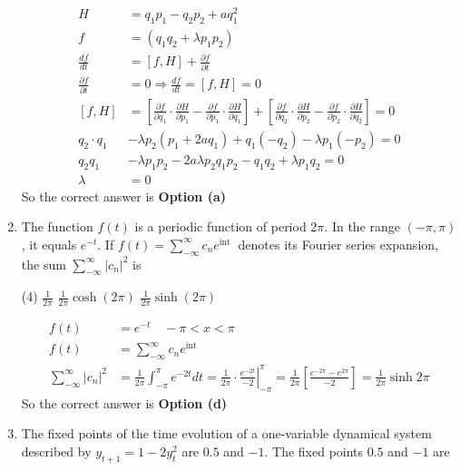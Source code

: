 \begin{enumerate}
\begin{answer}
\begin{align*}
	H&=q_{1} p_{1}-q_{2} p_{2}+a q_{1}^{2}\\
	f&=\left(q_{1} q_{2}+\lambda p_{1} p_{2}\right) \\
	\frac{d f}{d t}&=[f, H]+\frac{\partial f}{\partial t} \\
	\frac{\partial f}{\partial t}&=0 \Rightarrow \frac{d f}{d t}=[f, H]=0\\
	[f, H]&=\left[\frac{\partial f}{\partial q_{1}} \cdot \frac{\partial H}{\partial p_{1}}-\frac{\partial f}{\partial p_{1}} \cdot \frac{\partial H}{\partial q_{1}}\right]+\left[\frac{\partial f}{\partial q_{2}} \cdot \frac{\partial H}{\partial p_{2}}-\frac{\partial f}{\partial p_{2}} \cdot \frac{\partial H}{\partial q_{2}}\right]=0 \\
	q_{2} \cdot q_{1}&-\lambda p_{2}\left(p_{1}+2 a q_{1}\right)+q_{1}\left(-q_{2}\right)-\lambda p_{1}\left(-p_{2}\right)=0 \\
	q_{2} q_{1}&-\lambda p_{1} p_{2}-2 a \lambda p_{2} q_{1} p_{2}-q_{1} q_{2}+\lambda p_{1} q_{2}=0 \\
	\lambda&=0
	\end{align*}
		So the correct answer is \textbf{Option (a)}
\end{answer}
\item The function $f(t)$ is a periodic function of period $2 \pi$. In the range $(-\pi, \pi)$, it equals $e^{-t}$. If $f(t)=\sum_{-\infty}^{\infty} c_{n} e^{\text {int }}$ denotes its Fourier series expansion, the sum $\sum_{-\infty}^{\infty}\left|c_{n}\right|^{2}$ is
 \begin{tasks}(4)
	\task[\textbf{b.}]$\frac{1}{2 \pi}$
	\task[\textbf{c.}] $\frac{1}{2 \pi} \cosh (2 \pi)$
	\task[\textbf{d.}] $\frac{1}{2 \pi} \sinh (2 \pi)$
\end{tasks}
\begin{answer}
	\begin{align*}
	f(t)&=e^{-t} \quad-\pi<x<\pi\\
	f(t)&=\sum_{-\infty}^{\infty} c_{n} e^{\mathrm{int}} \\
	\sum_{-\infty}^{\infty}\left|c_{n}\right|^{2}&=\frac{1}{2 \pi} \int_{-\pi}^{\pi} e^{-2 t} d t=\left.\frac{1}{2 \pi} \cdot \frac{e^{-2 t}}{-2}\right|_{-\pi} ^{\pi}=\frac{1}{2 \pi}\left[\frac{e^{-2 \pi}-e^{2 \pi}}{-2}\right]=\frac{1}{2 \pi} \sinh 2 \pi
	\end{align*}
		So the correct answer is \textbf{Option (d)}
\end{answer}
\item The fixed points of the time evolution of a one-variable dynamical system described by $y_{t+1}=1-2 y_{t}^{2}$ are $0.5$ and $-1$. The fixed points $0.5$ and $-1$ are

\end{enumerate}
